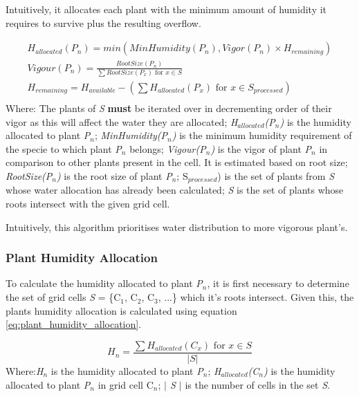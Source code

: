 Intuitively, it allocates each plant with the minimum amount of humidity it requires to survive plus the resulting overflow.

\begin{equation}
\begin{split}
H_{allocated}(P_{n}) = min(MinHumidity(P_{n}), Vigor(P_{n}) \times H_{remaining}) \\
Vigour(P_{n}) =  \frac{RootSize(P_{n})}{\sum RootSize(P_{x}) \text{ for } x \in S}\\
H_{remaining} = H_{available} - (\sum H_{allocated}(P_{x})  \text{ for } x \in S_{processed})\\
\end{split}
\label{eq:humidity_allocation_insufficient_calc}
\end{equation}
Where: The plants of \textit{S} \textbf{must} be iterated over in decrementing order of their vigor as this will affect the water they are allocated; \textit{H$_{allocated}$(P$_{n}$)} is the humidity allocated to plant \textit{P$_{n}$}; \textit{MinHumidity(P$_{n}$)} is the minimum humidity requirement of the specie to which plant \textit{P$_{n}$} belongs; \textit{Vigour(P$_{n}$)} is the vigor of plant \textit{P$_{n}$} in comparison to other plants present in the cell. It is estimated based on root size; \textit{RootSize(P$_{n}$)} is the root size of plant \textit{P$_{n}$}; S$_{processed}$) is the set of plants from \textit{S} whose water allocation has already been calculated; \textit{S} is the set of plants whose roots intersect with the given grid cell.

Intuitively, this algorithm prioritises water distribution to more vigorous plant's.

\subsubsection{Plant Humidity Allocation}

To calculate the humidity allocated to plant \textit{P$_{n}$}, it is first necessary to determine the set of grid cells \textit{S} = \{C$_{1}$, C$_{2}$, C$_{3}$, ...\} which it's roots intersect. Given this, the plants humidity allocation is calculated using equation \ref{eq:plant_humidity_allocation}. 

\begin{equation}
H_{n} = \frac{\sum H_{allocated}(C_{x}) \text{ for } x \in S}{| S |}
\label{eq:plant_humidity_allocation}
\end{equation}
Where:\textit{H$_{n}$} is the humidity allocated to plant \textit{P$_{n}$}; \textit{H$_{allocated}$(C$_{n}$)} is the humidity allocated to plant \textit{P$_{n}$} in grid cell C$_{n}$; \textit{$|$ S $|$} is the number of cells in the set \textit{S}.

